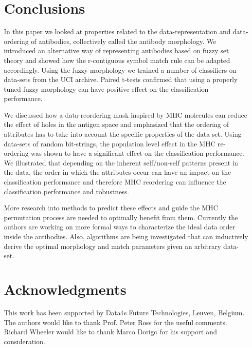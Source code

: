 \documentclass{llncs}
\begin{document}
\section{Conclusions}
\label{sec_conclusions}
In this paper we looked at properties related to the data-representation and data-ordering of antibodies, collectively called the antibody morphology.
We introduced an alternative way of representing antibodies based on fuzzy set theory and showed how the r-contiguous symbol match rule can be adapted accordingly.
Using the fuzzy morphology we trained a number of classifiers on data-sets from the UCI archive.
Paired t-tests confirmed that using a properly tuned fuzzy morphology can have positive effect on the classification performance.

We discussed how a data-reordering mask inspired by MHC molecules can reduce the effect of holes in the antigen space and emphasized that the ordering of attributes has to take into account the specific properties of the data-set.
Using data-sets of random bit-strings, the population level effect in the MHC re-ordering was shown to have a significant effect on the classification performance.
We illustrated that depending on the inherent self/non-self patterns present in the data, the order in which the attributes occur can have an impact on the classification performance and therefore MHC reordering can influence the classification performance and robustness.

More research into methods to predict these effects and guide the MHC permutation process are needed to optimally benefit from them.
Currently the authors are working on more formal ways to characterize the ideal data order inside the antibodies.
Also, algorithms are being investigated that can inductively derive the optimal morphology and match parameters given an arbitrary data-set.  

\section{Acknowledgments}
This work has been supported by Data4s Future Technologies, Leuven, Belgium.
The authors would like to thank Prof. Peter Ross for the useful comments.
Richard Wheeler would like to thank Marco Dorigo for his support and consideration.
\end{document}

